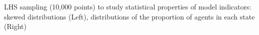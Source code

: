 {\bigskip
\bigskip

LHS sampling (10,000 points) to study statistical properties of model indicators: skewed distributions (Left), distributions of the proportion of agents in each state (Right)

}



